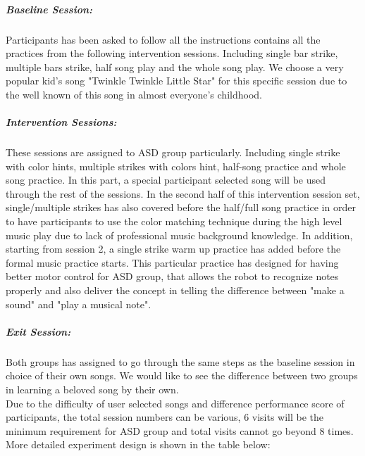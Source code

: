 \subparagraph{Baseline Session: }Participants has been asked to follow all the 
instructions contains all the practices from the following intervention sessions. 
Including single bar strike, multiple bars strike, half song play and the whole
song play. We choose a very popular kid's song "Twinkle Twinkle Little Star" 
for this specific session due to the well known of this song in almost 
everyone's childhood.\\

\subparagraph{Intervention Sessions: }These sessions are assigned to ASD group
particularly. Including single strike with color hints, multiple strikes with
colors hint, half-song practice and whole song practice. In this part, a special
participant selected song will be used through the rest of the sessions. In the second
half of this intervention session set, single/multiple strikes has also covered
before the half/full song practice in order to have participants to use the
color matching technique during the high level music play due to lack of professional
music background knowledge. In addition, starting from session 2, a single strike
warm up practice has added before the formal music practice starts. This particular
practice has designed for having better motor control for ASD group, that allows
the robot to recognize notes properly and also deliver the concept in telling the
difference between "make a sound" and "play a musical note". \\

\subparagraph{Exit Session: }Both groups has assigned to go through the same steps
as the baseline session in choice of their own songs. We would like to see the 
difference between two groups in learning a beloved song by their own.\\

Due to the difficulty of user selected songs and difference performance score of
participants, the total session numbers can be various, 6 visits will be the minimum
requirement for ASD group and total visits cannot go beyond 8 times. More detailed 
experiment design is shown in the table below:\\

